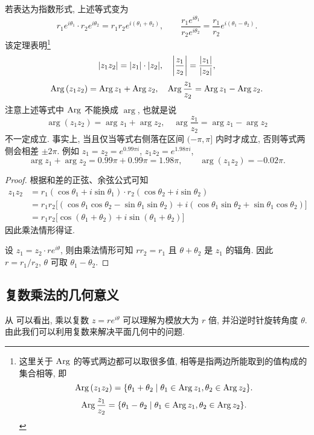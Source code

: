 若表达为指数形式, 上述等式变为
  \[
    r_1e^{i\theta_1}\cdot r_2e^{i\theta_2}=r_1r_2e^{i(\theta_1+\theta_2)},\qquad
    \frac{r_1e^{i\theta_1}}{r_2e^{i\theta_2}}=\frac{r_1}{r_2}e^{i(\theta_1-\theta_2)}.
  \]
该定理表明\footnote{这里关于 $\operatorname{Arg}$ 的等式两边都可以取很多值, 相等是指两边所能取到的值构成的集合相等, 即
  \[
    \operatorname{Arg}{(z_1z_2)}=\{\theta_1+\theta_2\mid\theta_1\in\operatorname{Arg} z_1,\theta_2\in\operatorname{Arg} z_2\}.
  \]
  \[
    \operatorname{Arg}{\frac{z_1}{z_2}}=\{\theta_1-\theta_2\mid\theta_1\in\operatorname{Arg} z_1,\theta_2\in\operatorname{Arg} z_2\}.
  \]
}
  \[|z_1z_2|=|z_1|\cdot|z_2|,\quad\left|\frac{z_1}{z_2}\right|=\frac{|z_1|}{|z_2|},\]
  \[\operatorname{Arg}{(z_1z_2)}=\operatorname{Arg} z_1+\operatorname{Arg} z_2,\quad
  \operatorname{Arg}{\frac{z_1}{z_2}}=\operatorname{Arg} z_1-\operatorname{Arg} z_2.\]
注意上述等式中 $\operatorname{Arg}$ 不能换成 $\arg$, 也就是说
  \[\arg{(z_1z_2)}=\arg z_1+\arg z_2,\quad
  \arg{\frac{z_1}{z_2}}=\arg z_1-\arg z_2\]
\alert{不一定成立}.
事实上, 当且仅当等式右侧落在区间 $(-\pi,\pi]$ 内时才成立, 否则等式两侧会相差 $\pm2\pi$.
例如 $z_1=z_2=e^{0.99\pi i}$, $z_1z_2=e^{1.98\pi i}$,
\[\arg z_1+\arg z_2=0.99\pi+0.99\pi=1.98\pi,\qquad
\arg(z_1z_2)=-0.02\pi.\]

\begin{proof}
  根据和差的正弦、余弦公式可知
  \begin{align*}
    z_1z_2&=r_1(\cos\theta_1+i\sin\theta_1)\cdot
    r_2(\cos\theta_2+i\sin\theta_2)\\
    &{=r_1r_2\bigl[(\cos\theta_1\cos\theta_2-\sin\theta_1\sin\theta_2)
    +i(\cos\theta_1\sin\theta_2+\sin\theta_1\cos\theta_2)\bigr]}\\
    &{=r_1r_2\bigl[\cos(\theta_1+\theta_2)+i\sin(\theta_1+\theta_2)\bigr]}
  \end{align*}
  因此乘法情形得证.

  设 $z_1=z_2\cdot re^{i\theta}$, 则由乘法情形可知 $rr_2=r_1$ 且 $\theta+\theta_2$ 是 $z_1$ 的辐角.
  因此 $r=r_1/r_2$, $\theta$ 可取 $\theta_1-\theta_2$.
\end{proof}


\subsection{复数乘法的几何意义}
从 可以看出, 乘以复数 $z=re^{i\theta}$ 可以理解为\alert{模放大为 $r$ 倍, 并沿逆时针旋转角度 $\theta$}.
由此我们可以利用复数来解决平面几何中的问题.

